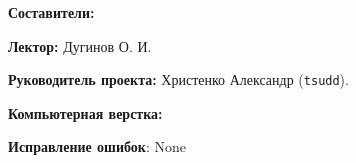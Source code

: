 \documentclass[../main.tex]{subfiles}
\begin{document}
 

{\Huge \bf Составители:}

\vspace{2em}

{
    \textbf{Лектор:} Дугинов О. И.
    
    \smallskip
    
    \textbf{Руководитель проекта:} Христенко Александр
    (\texttt{tsudd}).
    
    \smallskip
    
    \textbf{Компьютерная верстка:}

    
    \textbf{Исправление ошибок}: None
    
}

\pagebreak
\end{document}
